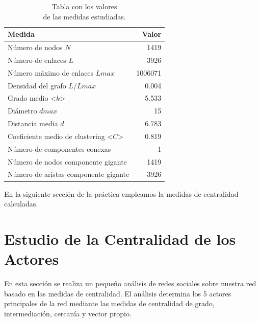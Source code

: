 \documentclass{uimppracticas}
\begin{document}
\begin{table}[H]
	\centering
	\begin{tabular}{|l|r|}
		\hline
		\textbf{Medida}                                            & \textbf{Valor} \\ \hline\hline
		Número de nodos $N$                                          & 1419           \\ \hline
		Número de enlaces $L$                                        & 3926           \\ \hline
		Número máximo de enlaces $Lmax$                              & 1006071        \\ \hline
		Densidad del grafo $L/Lmax$                                  & 0.004          \\ \hline
		Grado medio \textless{}$k$\textgreater{}                     & 5.533          \\ \hline
		Diámetro $dmax$                                              & 15             \\ \hline
		Distancia media $d$                                          & 6.783          \\ \hline
		Coeficiente medio de clustering \textless{}$C$\textgreater{} & 0.819          \\ \hline
		Número de componentes conexas                               & 1              \\ \hline
		Número de nodos componente gigante                          & 1419           \\ \hline
		Número de aristas componente gigante                        & 3926           \\ \hline
	\end{tabular}
	\caption{Tabla con los valores \\ de las medidas estudiadas.}
	\label{tabla}
\end{table}

En la siguiente sección de la práctica empleamos la medidas de centralidad calculadas.

\newpage

\section*{Estudio de la Centralidad de los Actores}

En esta sección se realiza un pequeño análisis de redes sociales sobre nuestra red basado en las medidas de centralidad. El análisis determina los 5 actores principales de la red mediante las medidas de centralidad de grado, intermediación, cercanía y vector propio.
\end{document}
